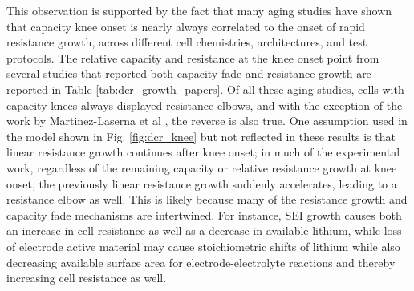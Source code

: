 \documentclass{article}
\begin{document}
This observation is supported by the fact that many aging studies have shown that capacity knee onset is nearly always correlated to the onset of rapid resistance growth, across different cell chemistries, architectures, and test protocols. The relative capacity and resistance at the knee onset point from several studies that reported both capacity fade and resistance growth are reported in Table \ref{tab:dcr_growth_papers}. Of all these aging studies, cells with capacity knees always displayed resistance elbows, and with the exception of the work by Martinez-Laserna et al \cite{martinez-laserna_technical_2018}, the reverse is also true. One assumption used in the model shown in Fig. \ref{fig:dcr_knee} but not reflected in these results is that linear resistance growth continues after knee onset; in much of the experimental work, regardless of the remaining capacity or relative resistance growth at knee onset, the previously linear resistance growth suddenly accelerates, leading to a resistance elbow as well. This is likely because many of the resistance growth and capacity fade mechanisms are intertwined. For instance, SEI growth causes both an increase in cell resistance as well as a decrease in available lithium, while loss of electrode active material may cause stoichiometric shifts of lithium while also decreasing available surface area for electrode-electrolyte reactions and thereby increasing cell resistance as well.
\end{document}
